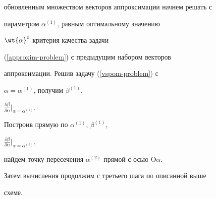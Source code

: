 обновленным множеством векторов аппроксимации начнем решать с


параметром $\alpha^{(1)}$, равным оптимальному значению


$\wt{\alpha}^0$ критерия качества задачи


(\ref{approxim-problem}) с предыдущим набором векторов


аппроксимации. Решив задачу (\ref{vspom-problem}) с


$\alpha=\alpha^{(1)}$, получим $\beta^{(1)}$,


$\frac{\partial\beta}{\partial\alpha}|_{\alpha=\alpha^{(1)}}$.


Построив прямую по $\alpha^{(1)}$, $\beta^{(1)}$,


$\frac{\partial\beta}{\partial\alpha}|_{\alpha=\alpha^{(1)}}$,


найдем точку пересечения $\alpha^{(2)}$ прямой с осью O$\alpha$.


Затем вычисления продолжим с третьего шага по описанной выше


схеме.


